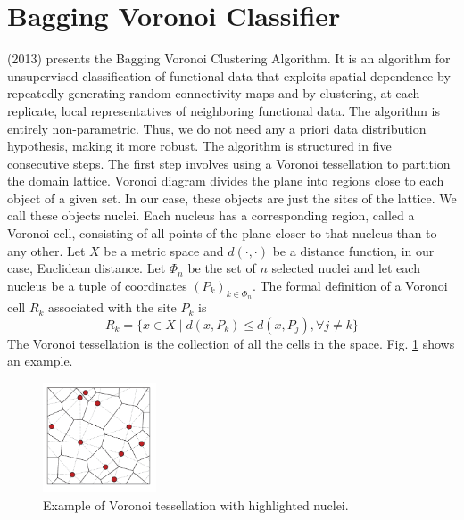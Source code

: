 \section{Bagging Voronoi Classifier}
\label{sec:bvc}
\citeauthor{secchi_bagging_2013} (2013) presents the Bagging Voronoi Clustering Algorithm. It is an algorithm for unsupervised classification of functional data that exploits spatial dependence by repeatedly generating random connectivity maps and by clustering, at each replicate, local representatives of neighboring functional data. The algorithm is entirely non-parametric. Thus, we do not need any a priori data distribution hypothesis, making it more robust. The algorithm is structured in five consecutive steps. The first step involves using a Voronoi tessellation to partition the domain lattice. Voronoi diagram divides the plane into regions close to each object of a given set. In our case, these objects are just the sites of the lattice. We call these objects nuclei. Each nucleus has a corresponding region, called a Voronoi cell, consisting of all points of the plane closer to that nucleus than to any other. Let $X$ be a metric space and $d(\cdot, \cdot)$ be a distance function, in our case, Euclidean distance. Let $\Phi_n$ be the set of $n$ selected nuclei and let each nucleus be a tuple of coordinates $\left(P_k\right)_{k\in \Phi_n}$. The formal definition of a Voronoi cell $R_k$ associated with the site $P_k$ is 
\begin{equation}
    \label{eq:voronoicell}
    R_k=\{x\in X \mid d(x, P_k)\leq d(x, P_j),\forall j\neq k\}
\end{equation}
The Voronoi tessellation is the collection of all the cells in the space.
Fig. \ref{fig:voronoi} shows an example.
\begin{figure}
    \centering
    \includegraphics[width=0.3\textwidth]{Images/A-set-of-atoms-the-associated-Voronoi-tessellation-solid-lines-and-the-Delaunay.png}
    \caption[Voronoi tessellation.]{Example of Voronoi tessellation with highlighted nuclei.}
    \label{fig:voronoi}
\end{figure}


